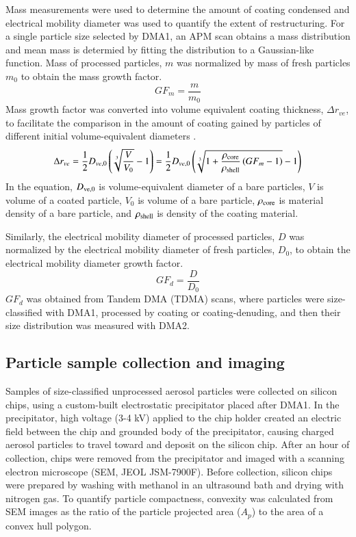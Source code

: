 Mass measurements were used to determine the amount of coating condensed and electrical mobility diameter was used to quantify the extent of restructuring. For a single particle size selected by DMA1, an APM scan obtains a mass distribution and mean mass is determied by fitting the distribution to a Gaussian-like function. Mass of processed particles, $m$ was normalized by mass of fresh particles $m_0$ to obtain the mass growth factor.
\begin{equation}
GF_m=\frac{m}{m_0}
\label{eq:gfm}
\end{equation}
Mass growth factor was converted into volume equivalent coating thickness, $\Delta r_{ve}$, to facilitate the comparison in the amount of coating gained by particles of different initial volume-equivalent diameters \citep{RN37}.
\begin{equation}
\Delta r_{ve}=\frac{1}{2}D_{ve,0}\left(\sqrt[3]{\frac{V}{V_0}}-1\right)=
\frac{1}{2}D_{ve,0}\left(\sqrt[3]{1+\frac{\rho_{\rm core}}{\rho_{\rm shell}}\left(GF_m-1\right)}-1\right)
\label{eq:drve}
\end{equation}
In the equation, $D_{\rm ve,0}$ is volume-equivalent diameter of a bare particles, $V$ is volume of a coated particle, $V_0$ is volume of a bare particle, $\rho_{\rm core}$ is material density of a bare particle, and $\rho_{\rm shell}$ is density of the coating material.

Similarly, the electrical mobility diameter of processed particles, $D$ was normalized by the electrical mobility diameter of fresh particles, $D_0$, to obtain the electrical mobility diameter growth factor.
\begin{equation}
GF_d=\frac{D}{D_0}
\label{eq:gfd}
\end{equation}
$GF_{d}$ was obtained from Tandem DMA (TDMA) scans, where particles were size-classified with DMA1, processed by coating or coating-denuding, and then their size distribution was measured with DMA2.

\subsection{Particle sample collection and imaging}

Samples of size-classified unprocessed aerosol particles were collected on silicon chips, using a custom-built electrostatic precipitator \citep{RN17,RN16} placed after DMA1. In the precipitator, high voltage (3-4 kV) applied to the chip holder created an electric field between the chip and grounded body of the precipitator, causing charged aerosol particles to travel toward and deposit on the silicon chip. After an hour of collection, chips were removed from the precipitator and imaged with a scanning electron microscope (SEM, JEOL JSM-7900F). Before collection, silicon chips were prepared by washing with methanol in an ultrasound bath and drying with nitrogen gas. To quantify particle compactness, convexity was calculated from SEM images as the ratio of the particle projected area ($A_p$) to the area of a convex hull polygon.

